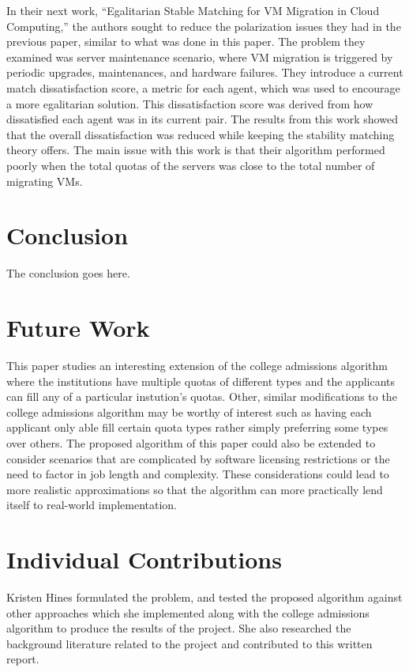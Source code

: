 \documentclass[conference]{IEEEtran}
\begin{document}
In their next work, “Egalitarian Stable Matching for VM Migration in Cloud Computing,” the authors sought to reduce the polarization issues they had in the previous paper, similar to what was done in this paper.  The problem they examined was server maintenance scenario, where VM migration is triggered by periodic upgrades, maintenances, and hardware failures.  They introduce a current match dissatisfaction score, a metric for each agent, which was used to encourage a more egalitarian solution.  This dissatisfaction score was derived from how dissatisfied each agent was in its current pair.  The results from this work showed that the overall dissatisfaction was reduced while keeping the stability matching theory offers.  The main issue with this work is that their algorithm performed poorly when the total quotas of the servers was close to the total number of migrating VMs.



\section{Conclusion}
The conclusion goes here.

\section{Future Work}
This paper studies an interesting extension of the college admissions
algorithm where the institutions have multiple quotas of different types
and the applicants can fill any of a particular instution's quotas.
Other, similar modifications to the college admissions algorithm 
may be worthy of interest such as having each applicant only able fill certain 
quota types rather 
simply preferring some types over others.
The proposed algorithm of this paper could also be extended to consider 
scenarios that are complicated by software licensing restrictions
or the need to factor in job length and complexity.
These considerations could lead to more realistic approximations 
so that the algorithm can more practically lend itself to 
real-world implementation.

\section{Individual Contributions}
Kristen Hines formulated the problem, 
and tested the proposed algorithm against other 
approaches which she implemented along with the 
college admissions algorithm to produce the 
results of the project.
She also researched the background literature related to the 
project and contributed to this written report.
\end{document}
